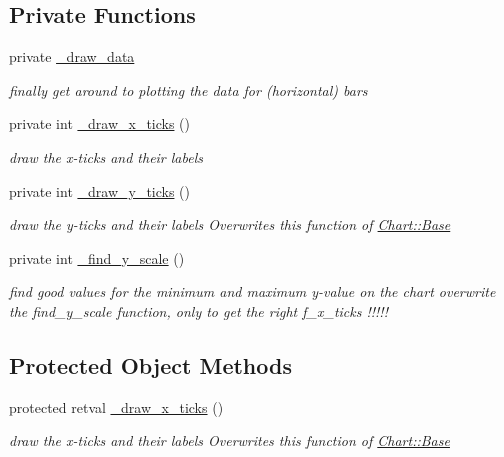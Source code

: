 \subsection*{Private Functions}
\label{_amgrp8d29cff216bafa3117e21883ea7c6b5f}
 \begin{DoxyCompactItemize}
\item 
\hypertarget{classChart_1_1HorizontalBars_ab15c9c83c6c3b7848d801f293cb887f0}{
private \hyperlink{classChart_1_1HorizontalBars_ab15c9c83c6c3b7848d801f293cb887f0}{\_\-draw\_\-data}}
\label{classChart_1_1HorizontalBars_ab15c9c83c6c3b7848d801f293cb887f0}

\begin{DoxyCompactList}\small\item\em finally get around to plotting the data for (horizontal) bars \item\end{DoxyCompactList}\item 
private int \hyperlink{classChart_1_1HorizontalBars_aabe5236ec45ce98269d60ea17944e283}{\_\-draw\_\-x\_\-ticks} ()
\begin{DoxyCompactList}\small\item\em draw the x-\/ticks and their labels \item\end{DoxyCompactList}\item 
private int \hyperlink{classChart_1_1HorizontalBars_afb085d5cca48ae94538f345945212a82}{\_\-draw\_\-y\_\-ticks} ()
\begin{DoxyCompactList}\small\item\em draw the y-\/ticks and their labels Overwrites this function of \hyperlink{classChart_1_1Base}{Chart::Base} \item\end{DoxyCompactList}\item 
private int \hyperlink{classChart_1_1HorizontalBars_acec45b0698c777d244fb6f6dd1202e20}{\_\-find\_\-y\_\-scale} ()
\begin{DoxyCompactList}\small\item\em find good values for the minimum and maximum y-\/value on the chart overwrite the find\_\-y\_\-scale function, only to get the right f\_\-x\_\-ticks !!!!! \item\end{DoxyCompactList}\end{DoxyCompactItemize}
\subsection*{Protected Object Methods}
\label{_amgrp06e02ce997685862181738d6a83b6f25}
 \begin{DoxyCompactItemize}
\item 
protected retval \hyperlink{classChart_1_1HorizontalBars_aabe5236ec45ce98269d60ea17944e283}{\_\-draw\_\-x\_\-ticks} ()
\begin{DoxyCompactList}\small\item\em draw the x-\/ticks and their labels Overwrites this function of \hyperlink{classChart_1_1Base}{Chart::Base} \item\end{DoxyCompactList}\end{DoxyCompactItemize}


